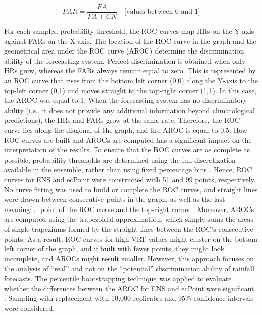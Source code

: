 \documentclass[techmemo]{ecmwfrep}%
\begin{document}
\begin{equation}
FAR = \frac{FA}{FA+CN} \quad \text{[values between 0 and 1]}
\label{eq:FAR}
\end{equation}

For each sampled probability threshold, the ROC curves map HRs on the Y-axis against FARs on the X-axis. The location of the ROC curve in the graph and the geometrical area under the ROC curve (AROC) determine the discrimination ability of the forecasting system. Perfect discrimination is obtained when only HRs grow, whereas the FARs always remain equal to zero. This is represented by an ROC curve that rises from the bottom left corner (0,0) along the Y-axis to the top-left corner (0,1) and moves straight to the top-right corner (1,1). In this case, the AROC was equal to 1.  When the forecasting system has no discriminatory ability (i.e., it does not provide any additional information beyond climatological predictions), the HRs and FARs grow at the same rate. Therefore, the ROC curve lies along the diagonal of the graph, and the AROC is equal to 0.5.
How ROC curves are built and AROCs are computed has a significant impact on the interpretation of the results. To ensure that the ROC curves are as complete as possible, probability thresholds are determined using the full discretization available in the ensemble, rather than using fixed percentage bins \citep{Bouallegue2022}. Hence, ROC curves for ENS and ecPoint were constructed with 51 and 99 points, respectively. No curve fitting was used to build or complete the ROC curves, and straight lines were drawn between consecutive points in the graph, as well as the last meaningful point of the ROC curve and the top-right corner \citep{Bouallegue2022}. Moreover, AROCs are computed using the trapezoidal approximation, which simply sums the areas of single trapeziums formed by the straight lines between the ROC’s consecutive points. As a result, ROC curves for high VRT values might cluster on the bottom left corner of the graph, and if built with fewer points, they might look incomplete, and AROCs might result smaller. However, this approach focuses on the analysis of “real” and not on the “potential” discrimination ability of rainfall forecasts. The percentile bootstrapping technique was applied to evaluate whether the differences between the AROC for ENS and ecPoint were significant \citep{DiCiccio1996}. Sampling with replacement with 10,000 replicates and 95\% confidence intervals were considered.
\end{document}
